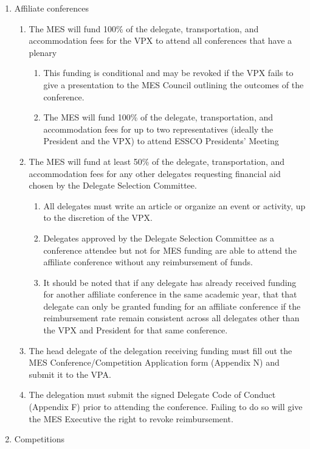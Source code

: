 \begin{enumerate}
 \item
  Affiliate conferences
  \begin{enumerate}
   \item
    The MES will fund 100\% of the delegate, transportation, and accommodation fees for the VPX to attend all conferences that have a plenary

    \begin{enumerate}
     \item
      This funding is conditional and may be revoked if the VPX fails to give a presentation to the MES Council outlining the outcomes of the conference.
     \item
      The MES will fund 100\% of the delegate, transportation, and accommodation fees for up to two representatives (ideally the President and the VPX) to attend ESSCO Presidents' Meeting
    \end{enumerate}
   \item
    The MES will fund at least 50\% of the delegate, transportation, and accommodation fees for any other delegates requesting financial aid chosen by the Delegate Selection Committee.

    \begin{enumerate}
     \item
      All delegates must write an article or organize an event or activity, up to the discretion of the VPX.
     \item
      Delegates approved by the Delegate Selection Committee as a conference attendee but not for MES funding are able to attend the affiliate conference without any reimbursement of funds.
     \item
      It should be noted that if any delegate has already received funding for another affiliate conference in the same academic year, that that delegate can only be granted funding for an affiliate conference if the reimbursement rate remain consistent across all delegates other than the VPX and President for that same conference.
    \end{enumerate}
   \item
    The head delegate of the delegation receiving funding must fill out the MES Conference/Competition Application form (Appendix N) and submit it to the VPA.
   \item
    The delegation must submit the signed Delegate Code of Conduct (Appendix F) prior to attending the conference. Failing to do so will give the MES Executive the right to revoke reimbursement.
  \end{enumerate}
 \item
  Competitions


\end{enumerate}
